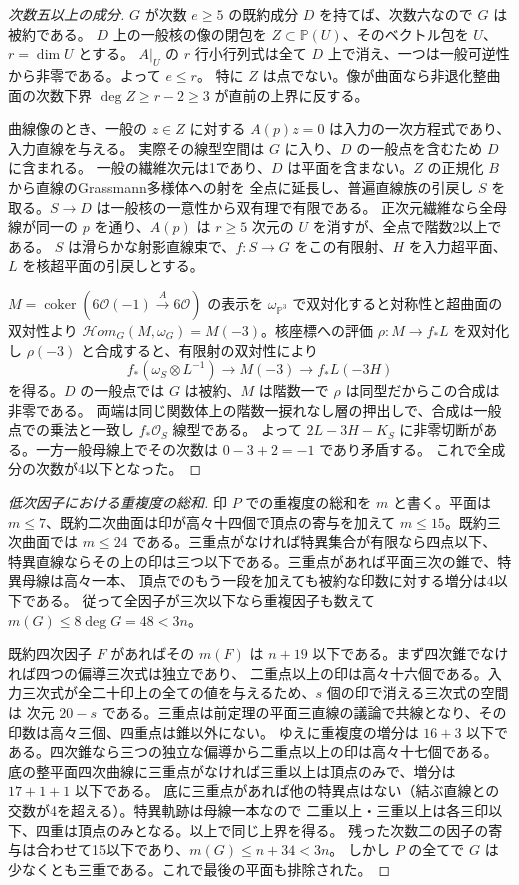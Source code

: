\begin{proof}[次数五以上の成分]
$G$ が次数 $e\ge5$ の既約成分 $D$ を持てば、次数六なので $G$ は被約である。
$D$ 上の一般核の像の閉包を $Z\subset\mathbb P(U)$、そのベクトル包を $U$、$r=\dim U$ とする。
$A|_U$ の $r$ 行小行列式は全て $D$ 上で消え、一つは一般可逆性から非零である。よって $e\le r$。
特に $Z$ は点でない。像が曲面なら非退化整曲面の次数下界 $\deg Z\ge r-2\ge3$ が直前の上界に反する。

曲線像のとき、一般の $z\in Z$ に対する $A(p)z=0$ は入力の一次方程式であり、入力直線を与える。
実際その線型空間は $G$ に入り、$D$ の一般点を含むため $D$ に含まれる。
一般の繊維次元は1であり、$D$ は平面を含まない。$Z$ の正規化 $B$ から直線のGrassmann多様体への射を
全点に延長し、普遍直線族の引戻し $S$ を取る。$S\to D$ は一般核の一意性から双有理で有限である。
正次元繊維なら全母線が同一の $p$ を通り、$A(p)$ は $r\ge5$ 次元の $U$ を消すが、全点で階数2以上である。
$S$ は滑らかな射影直線束で、$f:S\to G$ をこの有限射、$H$ を入力超平面、$L$ を核超平面の引戻しとする。

$M=\operatorname{coker}(6\mathcal O(-1)\xrightarrow{A}6\mathcal O)$ の表示を $\omega_{\mathbb P^3}$
で双対化すると対称性と超曲面の双対性より
$\mathcal Hom_G(M,\omega_G)=M(-3)$。核座標への評価 $\rho:M\to f_*L$ を双対化し
$\rho(-3)$ と合成すると、有限射の双対性により
\[
         f_*(\omega_S\otimes L^{-1})\longrightarrow M(-3)\longrightarrow f_*L(-3H)
\]
を得る。$D$ の一般点では $G$ は被約、$M$ は階数一で $\rho$ は同型だからこの合成は非零である。
両端は同じ関数体上の階数一捩れなし層の押出しで、合成は一般点での乗法と一致し $f_*\mathcal O_S$ 線型である。
よって $2L-3H-K_S$ に非零切断がある。一方一般母線上でその次数は $0-3+2=-1$ であり矛盾する。
これで全成分の次数が4以下となった。
\end{proof}
\begin{proof}[低次因子における重複度の総和]
印 $P$ での重複度の総和を $m$ と書く。平面は $m\le7$、既約二次曲面は印が高々十四個で頂点の寄与を加えて
$m\le15$。既約三次曲面では $m\le24$ である。三重点がなければ特異集合が有限なら四点以下、
特異直線ならその上の印は三つ以下である。三重点があれば平面三次の錐で、特異母線は高々一本、
頂点でのもう一段を加えても被約な印数に対する増分は4以下である。
従って全因子が三次以下なら重複因子も数えて $m(G)\le 8\deg G=48<3n$。

既約四次因子 $F$ があればその $m(F)$ は $n+19$ 以下である。まず四次錐でなければ四つの偏導三次式は独立であり、
二重点以上の印は高々十六個である。入力三次式が全二十印上の全ての値を与えるため、$s$ 個の印で消える三次式の空間は
次元 $20-s$ である。三重点は前定理の平面三直線の議論で共線となり、その印数は高々三個、四重点は錐以外にない。
ゆえに重複度の増分は $16+3$ 以下である。四次錐なら三つの独立な偏導から二重点以上の印は高々十七個である。
底の整平面四次曲線に三重点がなければ三重以上は頂点のみで、増分は $17+1+1$ 以下である。
底に三重点があれば他の特異点はない（結ぶ直線との交数が4を超える）。特異軌跡は母線一本なので
二重以上・三重以上は各三印以下、四重は頂点のみとなる。以上で同じ上界を得る。
残った次数二の因子の寄与は合わせて15以下であり、$m(G)\le n+34<3n$。
しかし $P$ の全てで $G$ は少なくとも三重である。これで最後の平面も排除された。
\end{proof}
